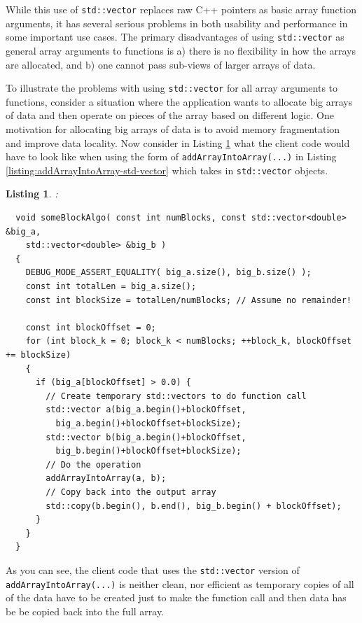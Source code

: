\documentclass[pdf,ps2pdf,11pt]{SANDreport}
\newtheorem{listing}{Listing}
\begin{document}
While this use of {}\texttt{std::vector} replaces raw C++ pointers as
basic array function arguments, it has several serious problems in
both usability and performance in some important use cases.  The
primary disadvantages of using {}\texttt{std::vector} as general array
arguments to functions is a) there is no flexibility in how the arrays
are allocated, and b) one cannot pass sub-views of larger arrays of
data.

To illustrate the problems with using {}\texttt{std::vector} for all
array arguments to functions, consider a situation where the
application wants to allocate big arrays of data and then operate on
pieces of the array based on different logic.  One motivation for
allocating big arrays of data is to avoid memory fragmentation and
improve data locality.  Now consider in Listing
{}\ref{listing:someBlockAlgo-std-vector} what the client code would
have to look like when using the form of
{}\texttt{addArrayIntoArray(...)} in Listing
{}\ref{listing:addArrayIntoArray-std-vector} which takes in
{}\texttt{std::vector} objects.

\begin{listing}:\\
\label{listing:someBlockAlgo-std-vector}
{\small\begin{verbatim}
  void someBlockAlgo( const int numBlocks, const std::vector<double> &big_a,
    std::vector<double> &big_b )
  {
    DEBUG_MODE_ASSERT_EQUALITY( big_a.size(), big_b.size() );
    const int totalLen = big_a.size();
    const int blockSize = totalLen/numBlocks; // Assume no remainder!
    
    const int blockOffset = 0;
    for (int block_k = 0; block_k < numBlocks; ++block_k, blockOffset += blockSize)
    {
      if (big_a[blockOffset] > 0.0) {
        // Create temporary std::vectors to do function call
        std::vector a(big_a.begin()+blockOffset,
          big_a.begin()+blockOffset+blockSize);
        std::vector b(big_a.begin()+blockOffset,
          big_b.begin()+blockOffset+blockSize);
        // Do the operation
        addArrayIntoArray(a, b);
        // Copy back into the output array
        std::copy(b.begin(), b.end(), big_b.begin() + blockOffset);
      }
    }
  }
\end{verbatim}}
\end{listing}

As you can see, the client code that uses the {}\texttt{std::vector}
version of {}\texttt{addArrayIntoArray(...)} is neither clean, nor
efficient as temporary copies of all of the data have to be created
just to make the function call and then data has be be copied back
into the full array.
\end{document}
